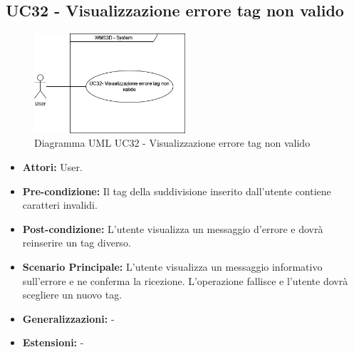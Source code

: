 \subsection{UC32 - Visualizzazione errore tag non valido}
\begin{figure}[H]
  \centering
  \includegraphics[width=0.5\textwidth]{UC_diagrams_28-32/UC32_sys.drawio.png}
  \caption{Diagramma UML UC32 - Visualizzazione errore tag non valido}
\end{figure}
\begin{itemize}
    \item \textbf{Attori:} User.
    \item \textbf{Pre-condizione:} Il tag della suddivisione inserito dall'utente contiene caratteri invalidi.
    \item \textbf{Post-condizione:} L'utente visualizza un messaggio d'errore e dovrà reinserire un tag diverso.
    \item \textbf{Scenario Principale:} L'utente visualizza un messaggio informativo sull'errore e ne conferma la ricezione. L'operazione fallisce e l'utente dovrà scegliere un nuovo tag.
    \item \textbf{Generalizzazioni:} -
    \item \textbf{Estensioni:} -
\end{itemize}